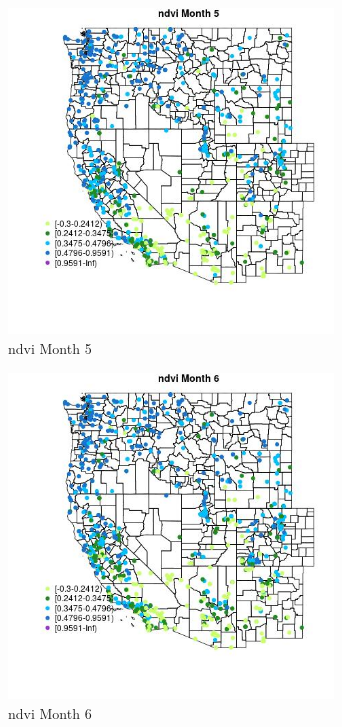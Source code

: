 \begin{figure} 
\centering  
\includegraphics[width=0.77\textwidth]{Code_Outputs/Report_ML_input_PM25_Step4_part_e_de_duplicated_aves_compiled_2019-05-21wNAs_MapObsMo5ndvi.jpg} 
\caption{\label{fig:Report_ML_input_PM25_Step4_part_e_de_duplicated_aves_compiled_2019-05-21wNAsMapObsMo5ndvi}ndvi Month 5} 
\end{figure} 
 

\begin{figure} 
\centering  
\includegraphics[width=0.77\textwidth]{Code_Outputs/Report_ML_input_PM25_Step4_part_e_de_duplicated_aves_compiled_2019-05-21wNAs_MapObsMo6ndvi.jpg} 
\caption{\label{fig:Report_ML_input_PM25_Step4_part_e_de_duplicated_aves_compiled_2019-05-21wNAsMapObsMo6ndvi}ndvi Month 6} 
\end{figure} 
 

